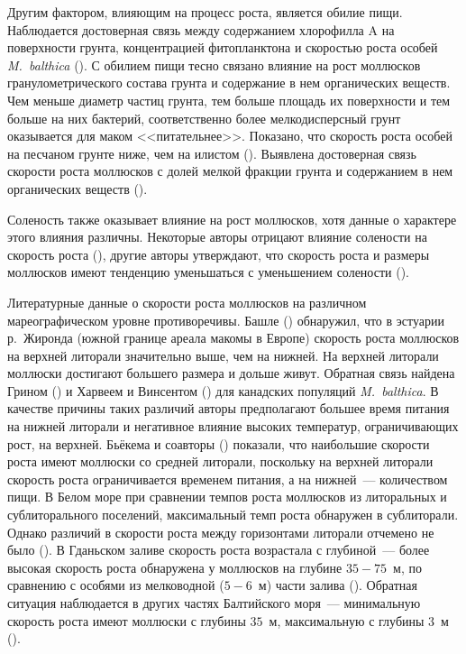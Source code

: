 Другим фактором, влияющим на процесс роста, является обилие пищи. 
Наблюдается достоверная связь между содержанием хлорофилла A на поверхности грунта, концентрацией фитопланктона и скоростью роста особей {\it M.~balthica} (\cite{Beukema_et_al_1977, Kube_et_al_1996}). 
С обилием пищи тесно связано влияние на рост моллюсков гранулометрического состава грунта и содержание в нем органических веществ. 
Чем меньше диаметр частиц грунта, тем больше площадь их поверхности и тем больше на них бактерий, соответственно более мелкодисперсный грунт оказывается для маком <<питательнее>>. 
Показано, что скорость роста особей на песчаном грунте ниже, чем на илистом (\cite{Wenne_Klusek_1985, Maximovich_et_al_1992}). 
Выявлена достоверная связь скорости роста моллюсков с долей мелкой фракции грунта и содержанием в нем органических веществ (\cite{Kube_et_al_1996}).

Соленость также оказывает влияние на рост моллюсков, хотя данные о характере этого влияния различны. 
Некоторые авторы отрицают влияние солености на скорость роста (\cite{Bachelet_1980}), другие авторы утверждают, что скорость роста и размеры моллюсков имеют тенденцию уменьшаться с уменьшением солености (\cite{Segerstrale_1960, Kube_et_al_1996}). 

Литературные данные о скорости роста моллюсков на различном мареографическом уровне противоречивы. 
Башле (\cite{Bachelet_1980}) обнаружил, что в эстуарии р.~Жиронда (южной границе ареала макомы в Европе) скорость роста моллюсков на верхней литорали значительно выше, чем на нижней. 
На верхней литорали моллюски достигают большего размера и дольше живут. 
Обратная связь найдена Грином (\cite{Green_1973}) и Харвеем и Винсентом (\cite{Harvey_Vincent_1990}) для канадских популяций {\it M.~balthica}. 
В качестве причины  таких различий авторы предполагают большее время питания на нижней литорали и негативное влияние высоких температур, ограничивающих рост, на верхней. 
Бьёкема и соавторы (\cite{Beukema_et_al_1977}) показали, что наибольшие скорости роста имеют моллюски со средней литорали, поскольку на верхней литорали скорость роста ограничивается временем питания, а на нижней~--- количеством пищи. 
В Белом море при сравнении темпов роста моллюсков из литоральных и сублиторального поселений, максимальный темп роста обнаружен в сублиторали. 
Однако различий в скорости роста между горизонтами литорали отчемено не было (\cite{Maximovich_et_al_1992}).
В Гданьском заливе скорость роста возрастала с глубиной~--- более высокая скорость роста обнаружена у моллюсков на глубине $35 - 75$~м, по сравнению с особями из мелководной ($5 - 6$~м) части залива (\cite{Wenne_Klusek_1985}). 
Обратная ситуация наблюдается в других частях Балтийского моря~--- минимальную скорость роста имеют моллюски с глубины $35$~м, максимальную с глубины $3$~м (\cite{Segerstrale_1960}). 

